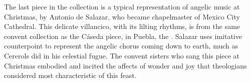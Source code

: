 The last piece in the collection is a typical representation of angelic music 
at Christmas, by Antonio de Salazar, who became chapelmaster of Mexico City 
Cathedral.
This delicate villancico, with its lilting rhythms, is from the same convent 
collection as the Cáseda piece, in Puebla, the .
Salazar uses imitative counterpoint to represent the angelic chorus coming down 
to earth, much as Cererols did in his celestial fugue. 
The convent sisters who sang this piece at Christmas embodied and incited the 
affects of wonder and joy that theologians considered most characteristic of 
this feast.


